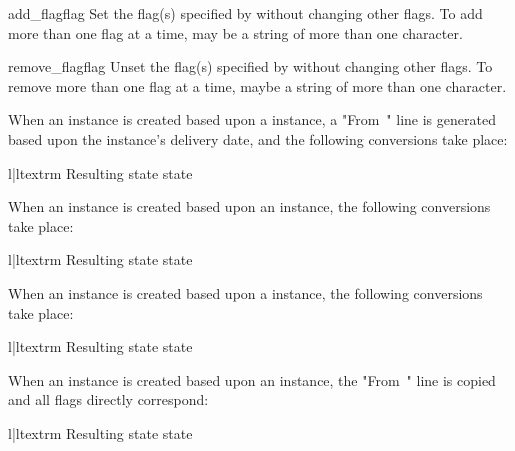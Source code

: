 \begin{methoddesc}{add_flag}{flag}
Set the flag(s) specified by  without changing other flags. To add
more than one flag at a time,  may be a string of more than one
character.
\end{methoddesc}

\begin{methoddesc}{remove_flag}{flag}
Unset the flag(s) specified by  without changing other flags. To
remove more than one flag at a time,  maybe a string of more than one
character.
\end{methoddesc}

When an  instance is created based upon a
 instance, a "From~" line is generated based upon the
 instance's delivery date, and the following conversions
take place:

\begin{tableii}{l|l}{textrm}
    {Resulting state}{ state}
\end{tableii}

When an  instance is created based upon an 
instance, the following conversions take place:

\begin{tableii}{l|l}{textrm}
    {Resulting state}{ state}
\end{tableii}

When an  instance is created based upon a
 instance, the following conversions take place:

\begin{tableii}{l|l}{textrm}
    {Resulting state}{ state}
\end{tableii}

When an  instance is created based upon an
 instance, the "From~" line is copied and all flags directly
correspond:

\begin{tableii}{l|l}{textrm}
    {Resulting state}{ state}
\end{tableii}

